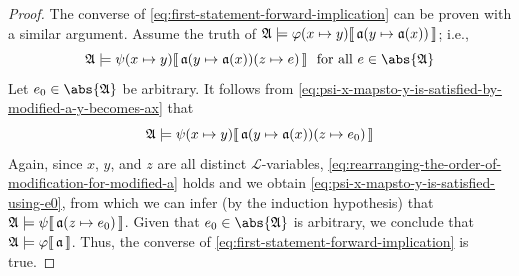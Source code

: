 \begin{proof}
    \vspace{0.3cm}
    \noindent
    The converse of \eqref{eq:first-statement-forward-implication} can be proven with a similar argument.
    Assume the truth of
    \( \folwffsatisfaction{\mathfrak{A}}{ \folfreevariablereplacement{\varphi}{x}{y} }{ \folmodifiedvariableassignmentfunction{\mathfrak{a}}{y}{ \mathfrak{a}(x) } } \);
    i.e.,
    \begin{equation}
        \label{eq:psi-x-mapsto-y-is-satisfied-by-modified-a-y-becomes-ax}
        \folwffsatisfaction{\mathfrak{A}}{ \folfreevariablereplacement{\psi}{x}{y} }{ \folmodifiedvariableassignmentfunction{ \folmodifiedvariableassignmentfunction{\mathfrak{a}}{y}{\mathfrak{a}(x)} }{z}{e} } \ \ \text{for all} \ e \in \abs{\mathfrak{A}}
    \end{equation}
    Let \( e_{0} \in \abs{\mathfrak{A}} \) be arbitrary.
    It follows from \eqref{eq:psi-x-mapsto-y-is-satisfied-by-modified-a-y-becomes-ax} that
    \begin{equation}
        \label{eq:psi-x-mapsto-y-is-satisfied-using-e0-2}
        \folwffsatisfaction{\mathfrak{A}}{ \folfreevariablereplacement{\psi}{x}{y} }{ \folmodifiedvariableassignmentfunction{ \folmodifiedvariableassignmentfunction{\mathfrak{a}}{y}{\mathfrak{a}(x)} }{z}{e_{0}} }
    \end{equation}
    Again, since \( x \), \( y \), and \( z \) are all distinct \( \mathcal{L} \)-variables, \eqref{eq:rearranging-the-order-of-modification-for-modified-a} holds and we obtain
    \eqref{eq:psi-x-mapsto-y-is-satisfied-using-e0}, from which we can infer (by the induction hypothesis) that
    \( \folwffsatisfaction{\mathfrak{A}}{\psi}{ \folmodifiedvariableassignmentfunction{\mathfrak{a}}{z}{e_{0}} } \).
    Given that \( e_{0} \in \abs{\mathfrak{A}} \) is arbitrary, we conclude that \(  \mathfrak{A} \models \varphi\llbracket\, \mathfrak{a} \,\rrbracket \).
    Thus, the converse of \eqref{eq:first-statement-forward-implication} is true.


\end{proof}
